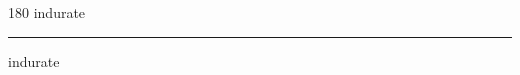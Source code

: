 
\begin{frame}
\begin{center}
\begin{turn}{180}
{\fontsize{2.5cm}{1em}\selectfont indurate}
\end{turn}
\vspace{1em}\par  
\hrule
\vspace{1em}\par  
{\fontsize{2.5cm}{1em}\selectfont indurate}
\end{center}
\end{frame}

